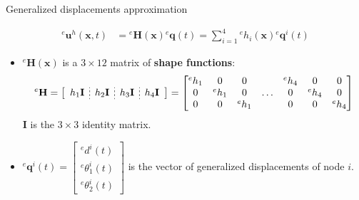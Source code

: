 \documentclass[aspectratio=169]{beamer}
\begin{document}
\begin{frame}{Generalized displacements approximation}
  \begin{block}{}
    \vspace{-0.4cm}
    \begin{align*}
      {}^e \mathbf u^{h}(\mathbf x,t) & ={}^e \mathbf H(\mathbf x){}^e\mathbf q(t) = \sum_{i=1}^{4}{}^eh_{i}(\mathbf x){}^e\mathbf q^{i}(t)
    \end{align*}
  \end{block}
  \begin{itemize}
    \item ${}^e\mathbf H(\mathbf x)$ is a $3\times 12$ matrix of \textbf{shape functions}:
          $$
            {}^e\mathbf H
            =\left[
              \begin{array}{c;{2pt/2pt}c;{2pt/2pt}c;{2pt/2pt}c}
                h_{1}\mathbf I & h_{2}\mathbf I & h_{3}\mathbf I & h_{4}\mathbf I \\
              \end{array} \right] = \begin{bmatrix}
              {}^eh_1 & 0       & 0       &       & {}^eh_{4} & 0         & 0         \\
              0       & {}^eh_1 & 0       & \dots & 0         & {}^eh_{4} & 0         \\
              0       & 0       & {}^eh_1 &       & 0         & 0         & {}^eh_{4} \\
            \end{bmatrix}
          $$
          $\mathbf I$ is the $3\times 3$ identity matrix.
    \item ${}^e\mathbf q^i(t)=\begin{bmatrix}
              {}^e d^{i}(t) \\ {}^e \theta^{i}_1(t) \\ {}^e \theta^{i}_2(t)
            \end{bmatrix}$ is the vector of generalized displacements of node $i$.
  \end{itemize}
\end{frame}
\end{document}

